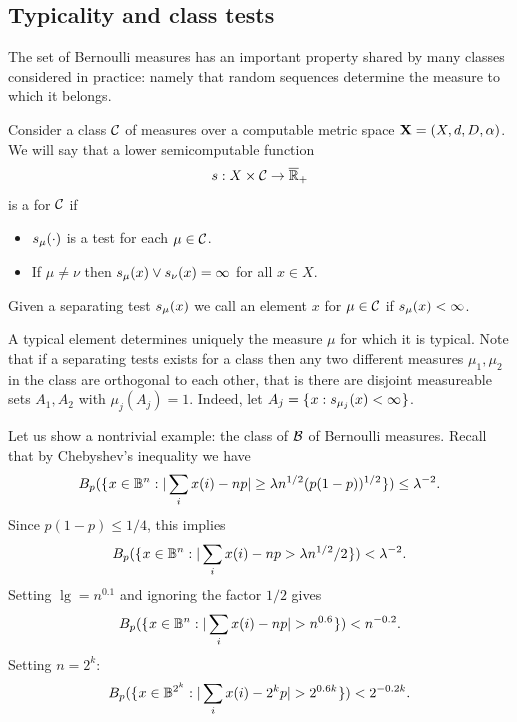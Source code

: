 \subsection{Typicality and class tests}

The set of Bernoulli measures has an important property shared by many
classes considered in practice: namely that random sequences determine the
measure to which it belongs.

 \begin{definition}
  \label{def:g4.2.6}
Consider a class \( \mathcal{C} \) of measures over a computable metric space
\( \mathbf{X} = (X,d,D,\alpha) \).
We will say that a lower semicomputable function
 \begin{align*}
  s:X\times\mathcal{C}\to\overline{\mathbb{R}}_{+}
 \end{align*}
is a  for \( \mathcal{C} \) if 
\begin{itemize}
\item \( s_{\mu}(\cdot) \) is a test for each \( \mu\in\mathcal{C} \).
\item If \( \mu\ne\nu \) then
\( s_{\mu}(x)\lor s_{\nu}(x)=\infty \) for all \( x\in X \).
\end{itemize}
Given a separating test \( s_{\mu}(x) \) we call an element \( x \)
 for \( \mu\in\mathcal{C} \) if \( s_{\mu}(x)<\infty \).
 \end{definition}

A typical element determines uniquely the measure \( \mu \) for which
it is typical.
Note that if a separating tests exists for a class then any two different
measures \( \mu_{1},\mu_{2} \) in the class are orthogonal to each other, that is there are
disjoint measureable sets \( A_{1},A_{2} \) with \( \mu_{j}(A_{j})=1 \).
Indeed, let \( A_{j}=\mathopen\{\mskip 1mu x:s_{\mu_{j}}(x)<\infty\mskip 1mu\mathclose\} \).

Let us show a nontrivial example: the class of \( \mathcal{B} \) of Bernoulli measures.
Recall that by Chebyshev's inequality we have
 \begin{align*}
   B_{p}(\mathopen\{\mskip 1mu x\in\mathbb{B}^{n}: |\sum_{i}x(i)-n p|\ge\lambda n^{1/2}(p(1-p))^{1/2}\mskip 1mu\mathclose\}) \le \lambda^{-2}.
 \end{align*}
Since \( p(1-p)\le 1/4 \), this implies
 \begin{align*}
   B_{p}(\mathopen\{\mskip 1mu x\in\mathbb{B}^{n}: |\sum_{i}x(i)-n p>\lambda n^{1/2}/2\mskip 1mu\mathclose\}) < \lambda^{-2}.
 \end{align*}
Setting \( \lg=n^{0.1} \) and ignoring the factor \( 1/2 \) gives
 \begin{align*}
   B_{p}(\setof{x\in\dB^{n}: |\sum_{i}x(i)-n p|> n^{0.6}})< n^{-0.2}.
 \end{align*}
Setting \( n=2^{k} \):
 \begin{align}\label{eq:2^k-Cheb}
   B_{p}(\setof{x\in\dB^{2^{k}}: |\sum_{i}x(i)-2^{k}p|> 2^{0.6 k}})< 2^{-0.2k}.
 \end{align}

